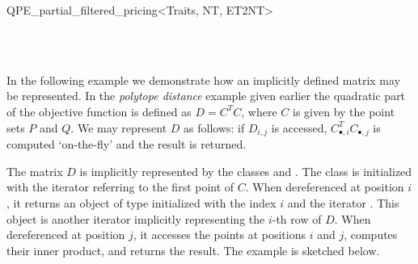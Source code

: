 \begin{ccRefClass}{QPE_partial_filtered_pricing<Traits, NT, ET2NT>}
\begin{ccIndexMemberFunctions}


\end{ccIndexMemberFunctions}


\ccSeeAlso
%
    \\
    \\

\ccImplementation
\ccIndexImplementation


\ccExample
In the following example we demonstrate how an implicitly defined matrix may be
represented.
In the \emph{polytope distance} example given earlier the quadratic part of the
objective function is defined as $D=C^{T}C$, where $C$ is given by the point
sets $P$ and $Q$. We may represent $D$ as follows: if $D_{i,j}$ is accessed,
$C_{\bullet, i}^{T}C_{\bullet, j}$ is computed `on-the-fly' and the result is
returned. 

The matrix $D$ is implicitly represented by the classes
 and .
The class  is initialized with the iterator
 referring to the first point of $C$. When dereferenced at
position $i$, it returns an object of type 
initialized with the index $i$ and the iterator . This object is
another iterator implicitly representing the $i$-th row of $D$. When
dereferenced at position $j$, it accesses the points at positions $i$ and $j$,
computes their inner product, and returns the result. The example is sketched
below.


\end{ccRefClass}


